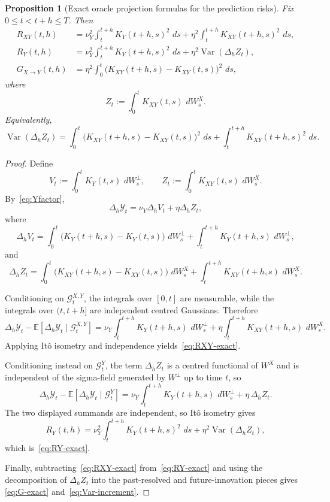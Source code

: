 \documentclass[11pt,a4paper]{amsart}
\theoremstyle{plain}
\newtheorem{proposition}[theorem]{Proposition}
\theoremstyle{definition}
\theoremstyle{remark}
\DeclareMathOperator{\Var}{Var}
\newcommand{\EE}{\mathbb{E}}
\newcommand{\dd}{\,d}
\begin{document}
\begin{proposition}[Exact oracle projection formulas for the prediction risks]
\label{prop:exact-risks}
Fix $0\le t<t+h\le T$. Then
\begin{align}
R_{XY}(t,h)
&=
\nu_Y^2 \int_t^{t+h} K_Y(t+h,s)^2\,\dd s
+ \eta^2 \int_t^{t+h} K_{XY}(t+h,s)^2\,\dd s, \label{eq:RXY-exact}\\
R_Y(t,h)
&=
\nu_Y^2 \int_t^{t+h} K_Y(t+h,s)^2\,\dd s
+ \eta^2 \Var(\Delta_h Z_t), \label{eq:RY-exact}\\
G_{X\to Y}(t,h)
&=
\eta^2 \int_0^t \bigl(K_{XY}(t+h,s)-K_{XY}(t,s)\bigr)^2\,\dd s, \label{eq:G-exact}
\end{align}
where
\[
Z_t:=\int_0^t K_{XY}(t,s)\,\dd W_s^X.
\]
Equivalently,
\begin{equation}\label{eq:Var-increment}
\Var(\Delta_h Z_t)
=
\int_0^t \bigl(K_{XY}(t+h,s)-K_{XY}(t,s)\bigr)^2\,\dd s
+ \int_t^{t+h} K_{XY}(t+h,s)^2\,\dd s.
\end{equation}
\end{proposition}

\begin{proof}
Define
\[
V_t:=\int_0^t K_Y(t,s)\,\dd W_s^\perp,
\qquad
Z_t:=\int_0^t K_{XY}(t,s)\,\dd W_s^X.
\]
By~\eqref{eq:Yfactor},
\[
\Delta_h \mathcal Y_t
=
\nu_Y \Delta_h V_t + \eta \Delta_h Z_t,
\]
where
\[
\Delta_h V_t
=
\int_0^t \bigl(K_Y(t+h,s)-K_Y(t,s)\bigr)\,\dd W_s^\perp
+ \int_t^{t+h} K_Y(t+h,s)\,\dd W_s^\perp,
\]
and
\[
\Delta_h Z_t
=
\int_0^t \bigl(K_{XY}(t+h,s)-K_{XY}(t,s)\bigr)\,\dd W_s^X
+ \int_t^{t+h} K_{XY}(t+h,s)\,\dd W_s^X.
\]

Conditioning on $\mathcal G_t^{X,Y}$, the integrals over $[0,t]$ are measurable, while
the integrals over $(t,t+h]$ are independent centred Gaussians. Therefore
\[
\Delta_h \mathcal Y_t-\EE[\Delta_h\mathcal Y_t\mid \mathcal G_t^{X,Y}]
=
\nu_Y\int_t^{t+h} K_Y(t+h,s)\,\dd W_s^\perp
+ \eta\int_t^{t+h} K_{XY}(t+h,s)\,\dd W_s^X.
\]
Applying It\^o isometry and independence yields~\eqref{eq:RXY-exact}.

Conditioning instead on $\mathcal G_t^Y$, the term $\Delta_h Z_t$ is a centred functional of
\(W^X\) and is independent of the sigma-field generated by \(W^\perp\) up to time \(t\), so
\[
\Delta_h \mathcal Y_t-\EE[\Delta_h\mathcal Y_t\mid \mathcal G_t^Y]
=
\nu_Y\int_t^{t+h} K_Y(t+h,s)\,\dd W_s^\perp
+ \eta\,\Delta_h Z_t.
\]
The two displayed summands are independent, so It\^o isometry gives
\[
R_Y(t,h)
=
\nu_Y^2 \int_t^{t+h} K_Y(t+h,s)^2\,\dd s
+ \eta^2 \Var(\Delta_h Z_t),
\]
which is~\eqref{eq:RY-exact}.

Finally, subtracting~\eqref{eq:RXY-exact} from~\eqref{eq:RY-exact} and using the
decomposition of $\Delta_h Z_t$ into the past-resolved and future-innovation pieces gives
\eqref{eq:G-exact} and~\eqref{eq:Var-increment}.
\end{proof}
\end{document}
